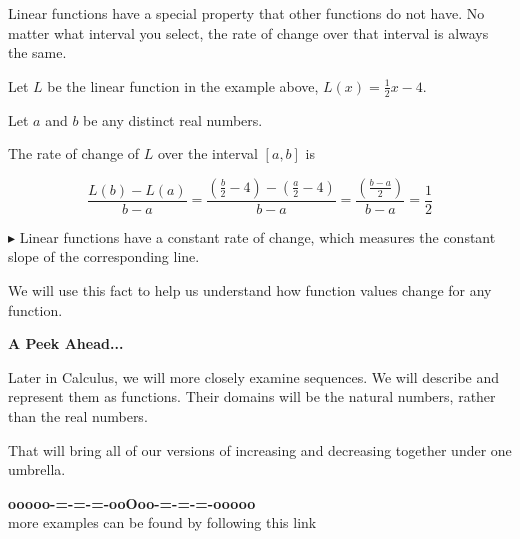 \documentclass{ximera}
\begin{document}
Linear functions have a special property that other functions do not have.  No matter what interval you select, the rate of change over that interval is always the same. 



Let $L$ be the linear function in the example above, $L(x) = \frac{1}{2} x - 4$. 

Let $a$ and $b$ be any distinct real numbers. 

The rate of change of $L$ over the interval $[a, b]$ is


\[
\frac{L(b) - L(a)}{b - a} = \frac{\left( \frac{b}{2} - 4 \right) - \left( \frac{a}{2} - 4 \right)}{b-a} 
= \frac{\left( \frac{b - a}{2} \right)}{b-a} = \frac{1}{2}
\]



\textbf{\textcolor{blue!55!black}{$\blacktriangleright$}} Linear functions have a constant rate of change, which measures the constant slope of the corresponding line. 



We will use this fact to help us understand how function values change for any function.



\textbf{\textcolor{red!70!black}{A Peek Ahead...}}



Later in Calculus, we will more closely examine sequences.  We will describe and represent them as functions.  Their domains will be the natural numbers, rather than the real numbers. 


That will bring all of our versions of increasing and decreasing together under one umbrella.


































\begin{center}
\textbf{\textcolor{green!50!black}{ooooo-=-=-=-ooOoo-=-=-=-ooooo}} \\

more examples can be found by following this link\\ 

\end{center}
\end{document}
